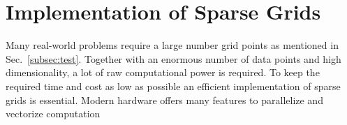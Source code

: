 \section{Implementation of Sparse Grids}
Many real-world problems require a large number grid points as mentioned in
Sec.~\ref{subsec:test}. Together with an enormous number of data points and
high dimensionality, a lot of raw computational power is required. To keep
the required time and cost as low as possible an efficient implementation of
sparse grids is essential. Modern hardware offers many features to parallelize
and vectorize computation 

